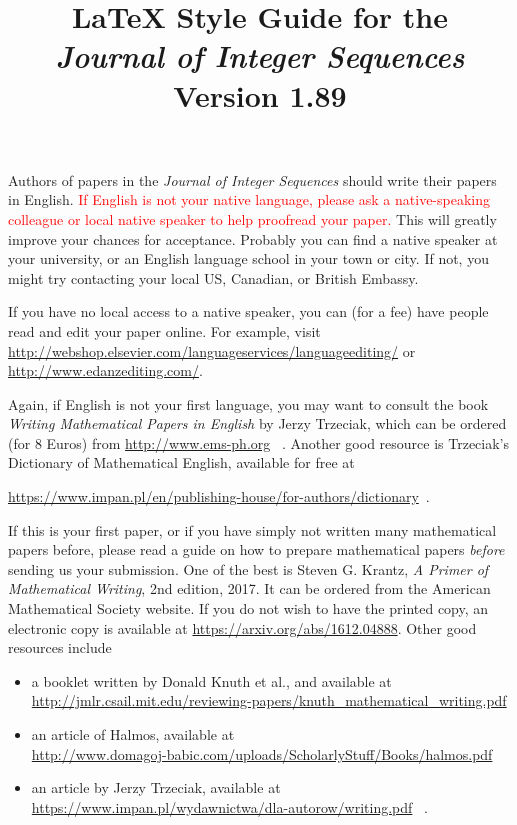 \documentclass[12pt]{article}
\begin{document}
\title{LaTeX Style Guide for the\\
{\it Journal of Integer Sequences}\\
\large Version 1.89}

\date{}
\author{}
\maketitle

	Authors of papers in the {\it Journal of Integer Sequences} should
write their papers in English.  
\textcolor{red}{If English is not your native language,
please ask a native-speaking colleague or local native speaker to
help proofread your paper.}    This will greatly improve your chances for
acceptance.  Probably you can find a native speaker at your university, or
an English language school in your town or city.
If not, you might try contacting your local US, Canadian, or British Embassy.

If you have no local access to a native speaker, you can (for a fee) have
people read and edit your paper online.  For example, visit \newline
\url{http://webshop.elsevier.com/languageservices/languageediting/} or
\newline
\url{http://www.edanzediting.com/}.

Again, if English is not your first language, you may want to consult
the book {\it Writing Mathematical Papers in English} by Jerzy Trzeciak,
which can be ordered (for 8 Euros) from \url{http://www.ems-ph.org} \ .  
Another good
resource is Trzeciak's Dictionary of Mathematical English, available
for free at \\
\centerline{\url{https://www.impan.pl/en/publishing-house/for-authors/dictionary}\ .}

If this is your first paper, or if you have simply not written many mathematical papers before, please read a guide on how to prepare mathematical papers
{\it before\/} sending us your submission.
One of the best is Steven G. Krantz, {\it A Primer of Mathematical
Writing}, 2nd edition, 2017.  It can be ordered from the
American Mathematical Society website.  If you do not wish to have the printed
copy, an electronic copy is available at
\url{https://arxiv.org/abs/1612.04888}.
Other good resources include
\begin{itemize}
\item a booklet written by Donald Knuth et al., and
available at \\ \url{http://jmlr.csail.mit.edu/reviewing-papers/knuth_mathematical_writing.pdf} 
\item an article of Halmos, available at \\
\url{http://www.domagoj-babic.com/uploads/ScholarlyStuff/Books/halmos.pdf} 
\item an article by Jerzy Trzeciak, available at \\
\url{https://www.impan.pl/wydawnictwa/dla-autorow/writing.pdf} \ .
\end{itemize}
\end{document}
